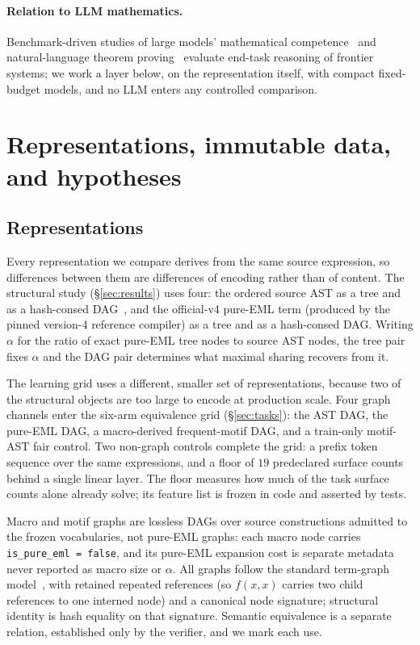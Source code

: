 \documentclass[11pt]{article}
\begin{document}
\paragraph{Relation to LLM mathematics.} Benchmark-driven studies of large
models' mathematical competence~\cite{hendrycks2021measuring} and
natural-language theorem proving~\cite{welleck2021naturalproofs} evaluate
end-task reasoning of frontier systems; we work a layer below, on the
representation itself, with compact fixed-budget models, and no LLM enters any
controlled comparison.

\section{Representations, immutable data, and hypotheses}
\label{sec:data}

\subsection{Representations}
Every representation we compare derives from the same source expression, so
differences between them are differences of encoding rather than of content. The
structural study (\S\ref{sec:results}) uses four: the ordered source AST as a
tree and as a hash-consed DAG~\cite{ershov1958,filliatre2006}, and the
official-v4 pure-EML term (produced by the pinned version-4 reference compiler)
as a tree and as a hash-consed DAG. Writing $\alpha$ for the ratio of exact
pure-EML tree nodes to source AST nodes, the tree pair fixes $\alpha$ and the
DAG pair determines what maximal sharing recovers from it.

The learning grid uses a different, smaller set of representations, because two
of the structural objects are too large to encode at production scale. Four graph
channels enter the six-arm equivalence grid (\S\ref{sec:tasks}): the AST DAG,
the pure-EML DAG, a macro-derived frequent-motif DAG, and a train-only motif-AST
fair control. Two non-graph controls complete the grid: a prefix token sequence
over the same expressions, and a floor of $19$ predeclared surface counts behind
a single linear layer. The floor measures how much of the task surface counts alone already
solve; its feature list is frozen in code and asserted by tests.

Macro and motif graphs are lossless DAGs over source constructions admitted to
the frozen vocabularies, not pure-EML graphs: each macro node carries \texttt{is\_pure\_eml = false}, and its
pure-EML expansion cost is separate metadata never reported as macro size or
$\alpha$. All graphs follow the standard term-graph
model~\cite{barendregt1987}, with retained repeated references (so $f(x,x)$
carries two child references to one interned node) and a canonical node
signature; structural identity is
hash equality on that signature. Semantic equivalence is a separate relation,
established only by the verifier, and we mark each use.
\end{document}
